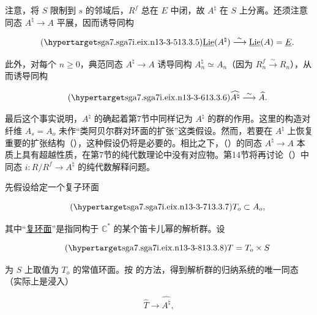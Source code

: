\noindent
注意，将 $S$ 限制到 $s$ 的邻域后，$R^f$ 总在 $E$ 中闭，故 $A^\natural$ 在 $S$ 上分离。还须注意同态 $A^\natural\longrightarrow A$ 平展，因而诱导同构

\begin{equation}\tag{\SGARefTarget{sga7.sga7i.eix.n13-3-5}{13.3.5}}
 \underline{\operatorname{Lie}}(A^\natural)
 \stackrel{\sim}{\longrightarrow}
 \underline{\operatorname{Lie}}(A)=\underline E.
\end{equation}

\noindent
此外，对每个 $n\geqslant0$，典范同态 $A^\natural\longrightarrow A$ 诱导同构 $A_n^\natural\simeq A_n$（因为 $R_n^f\stackrel{\sim}{\longrightarrow}R_n$），从而诱导同构

\begin{equation}\tag{\SGARefTarget{sga7.sga7i.eix.n13-3-6}{13.3.6}}
 \widehat{A^\natural}\stackrel{\sim}{\longrightarrow}\widehat A.
\end{equation}

\noindent
最后这个事实说明，$A^\natural$ 的确起着第7节中同样记为 $A^\natural$ 的群的作用。这里的构造对纤维 $A_s=A_o$ 未作“类阿贝尔群对环面的扩张”这类假设。然而，若要在 $A^\natural$ 上恢复重要的扩张结构（），这种假设仍将是必要的。相比之下，（）的同态 $A^\natural\longrightarrow A$ 本质上具有超越性质，在第7节的纯代数理论中没有对应物。第14节将再讨论（）中同态 $i:R/R^f\longrightarrow A^\natural$ 的纯代数解释问题。

先假设给定一个复子环面

\begin{equation}\tag{\SGARefTarget{sga7.sga7i.eix.n13-3-7}{13.3.7}}
 T_o\subset A_o,
\end{equation}

\noindent
其中“\underline{复环面}”是指同构于 $\mathbb C^*$ 的某个笛卡儿幂的解析群。设

\begin{equation}\tag{\SGARefTarget{sga7.sga7i.eix.n13-3-8}{13.3.8}}
 T=T_o\times S
\end{equation}

\noindent
为 $S$ 上取值为 $T_o$ 的常值环面。按  的方法，得到解析群的归纳系统的唯一同态（实际上是浸入）

\begin{equation*}
 \widehat T\longrightarrow\widehat{A^\natural},
\end{equation*}

